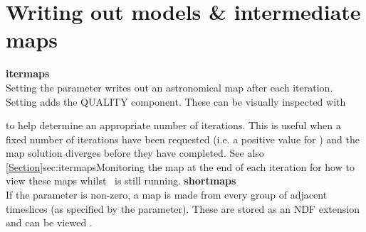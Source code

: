 \section{Writing out models \& intermediate maps}
\label{sec:inter}

\textbf{itermaps}\\
Setting the parameter  writes out an astronomical
map after each iteration. Setting  adds the QUALITY
component.  These can be visually inspected with

\begin{terminalv}
\end{terminalv}
to help determine an appropriate number of iterations. This is useful
when a fixed number of iterations have been requested (i.e. a positive
value for ) and the map solution diverges before
they have completed. See also \cref{Section}{sec:itermaps}{Monitoring the map
at the end of each iteration} for how to view these maps whilst \makemap\ is still running.
\newline\newline
\textbf{shortmaps}\\
If the parameter  is non-zero, a map is made from
every group of adjacent timeslices (as specified by the parameter).
These are stored as an NDF extension and can be viewed \gaia.

